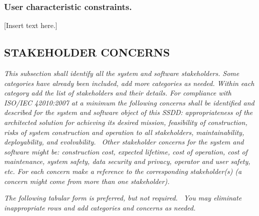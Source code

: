 \documentclass[twoside,letterpaper]{article}
\begin{document}
\subsubsection{User characteristic constraints.}
{\color{black}
[Insert text here.]}

\subsection[STAKEHOLDER
CONCERNS]{\bfseries\color{black} STAKEHOLDER
CONCERNS}
{\itshape\color{black}
This subsection shall identify all the system and software stakeholders.
Some categories have already been included, add more categories as
needed. Within each category add the list of stakeholders and their
details. For compliance with ISO/IEC 42010:2007 at a minimum the
following concerns shall be identified and described for the system and
software object of this SSDD: appropriateness of the architected
solution for achieving its desired mission, feasibility of
construction, risks of system construction and operation to all
stakeholders, maintainability, deployability, and evolvability. \ Other
stakeholder concerns for the system and software might be: construction
cost, expected lifetime, cost of operation, cost of maintenance, system
safety, data security and privacy, operator and user safety, etc. For
each concern make a reference to the corresponding stakeholder(s) (a
concern might come from more than one stakeholder).}


\bigskip

{\itshape\color{black}
The following tabular form is preferred, but not required. \ You may
eliminate inappropriate rows and add categories and concerns as
needed.}
\end{document}
